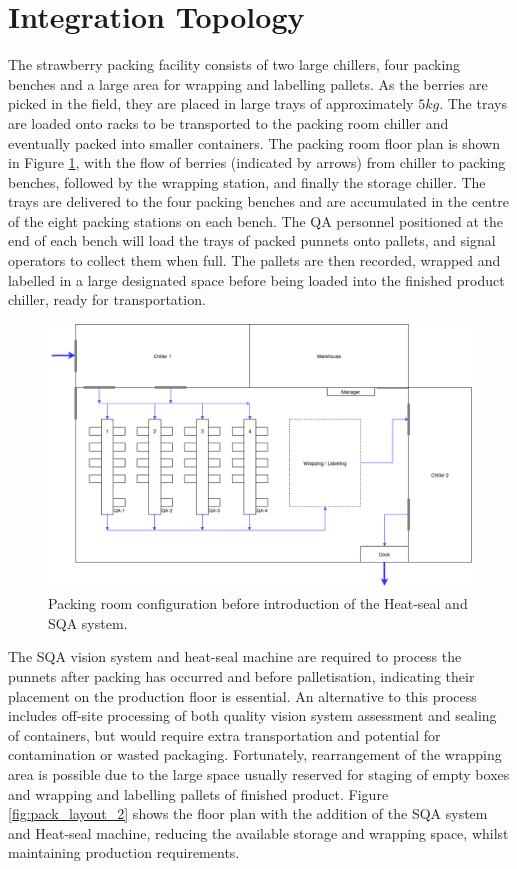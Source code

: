 \documentclass[fleqn,twoside,12pt]{report}
\begin{document}
\section{Integration Topology}
  

The strawberry packing facility consists of two large chillers, four packing benches and a large area for wrapping and labelling pallets. As the berries are picked in the field, they are placed in large trays of approximately $5kg$. The trays are loaded onto racks to be transported to the packing room chiller and eventually packed into smaller containers. The packing room floor plan is shown in Figure \ref{fig:pack_layout_1}, with the flow of berries (indicated by arrows) from chiller to packing benches, followed by the wrapping station, and finally the storage chiller. The trays are delivered to the four packing benches and are accumulated in the centre of the eight packing stations on each bench. The QA personnel positioned at the end of each bench will load the trays of packed punnets onto pallets, and signal operators to collect them when full. The pallets are then recorded, wrapped and labelled in a large designated space before being loaded into the finished product chiller, ready for transportation.


\begin{figure}[h]
	\centering
	\includegraphics[width=.95\linewidth]{Pack_layout_1.png}
	\caption{Packing room configuration before introduction of the Heat-seal and SQA system.}
	\label{fig:pack_layout_1}
\end{figure}%


The SQA vision system and heat-seal machine are required to process the punnets after packing has occurred and before palletisation, indicating their placement on the production floor is essential. An alternative to this process includes off-site processing of both quality vision system assessment and sealing of containers, but would require extra transportation and potential for contamination or wasted packaging. Fortunately, rearrangement of the wrapping area is possible due to the large space usually reserved for staging of empty boxes and wrapping and labelling pallets of finished product. Figure \ref{fig:pack_layout_2} shows the floor plan with the addition
of the SQA system and Heat-seal machine, reducing the available storage and wrapping space, whilst maintaining production requirements.
\end{document}
